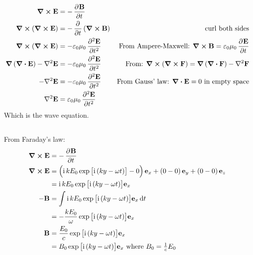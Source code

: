 \subsection{}
\begin{align*}
    \curl{\mathbf{E}} & = - \dpd{\mathbf{B}}{t}\\
    \curl{\del{\curl{\mathbf{E}}}} & = - \dpd{}{t} \del{\curl{\mathbf{B}}} & \textrm{curl both sides}\\
    \curl{\del{\curl{\mathbf{E}}}} & = - \varepsilon_0 \mu_0 \dpd[2]{\mathbf{E}}{t} & \textrm{From Ampere-Maxwell: $ \curl{\mathbf{B}} = \varepsilon_0 \mu_0 \dpd{\mathbf{E}}{t} $}\\
    \grad{\del{\div{\mathbf{E}}}} - \laplacian{\mathbf{E}} & = - \varepsilon_0 \mu_0 \dpd[2]{\mathbf{E}}{t} & \textrm{From: $ \curl{\del{\curl{\mathbf{F}}}} = \grad{\del{\div{\mathbf{F}}}} - \laplacian{\mathbf{F}} $}\\
    - \laplacian{\mathbf{E}} & = - \varepsilon_0 \mu_0 \dpd[2]{\mathbf{E}}{t} & \textrm{From Gauss' law: $ \div{\mathbf{E}} = 0 $ in empty space}\\
    \laplacian{\mathbf{E}} & = \varepsilon_0 \mu_0 \dpd[2]{\mathbf{E}}{t}
\end{align*}
Which is the wave equation.

\subsection{}
From Faraday's law:
\begin{align*}
    \curl{\mathbf{E}} & = - \dpd{\mathbf{B}}{t}\\
    \curl{\mathbf{E}} & = \del{\operatorname{i}k E_0 \operatorname{exp}{\sbr{\operatorname{i}\del{ky - \omega t}}} - 0}\mathbf{e}_x + \del{0 - 0} \mathbf{e}_y + \del{0 - 0} \mathbf{e}_z\\
    & = \operatorname{i}k E_0 \operatorname{exp}{\sbr{\operatorname{i}\del{ky - \omega t}}} \mathbf{e}_x\\
    - \mathbf{B} & = \int \operatorname{i}k E_0 \operatorname{exp}{\sbr{\operatorname{i}\del{ky - \omega t}}} \mathbf{e}_x \dif t\\
    & = - \frac{k E_0}{\omega} \operatorname{exp}{\sbr{\operatorname{i}\del{ky - \omega t}}} \mathbf{e}_x\\
    \mathbf{B} & = \frac{E_0}{c} \operatorname{exp}{\sbr{\operatorname{i}\del{ky - \omega t}}} \mathbf{e}_x\\
    & = B_0 \operatorname{exp}{\sbr{\operatorname{i}\del{ky - \omega t}}} \mathbf{e}_x \textrm{ where $ B_0 = \tfrac{1}{c} E_0 $}
\end{align*}

